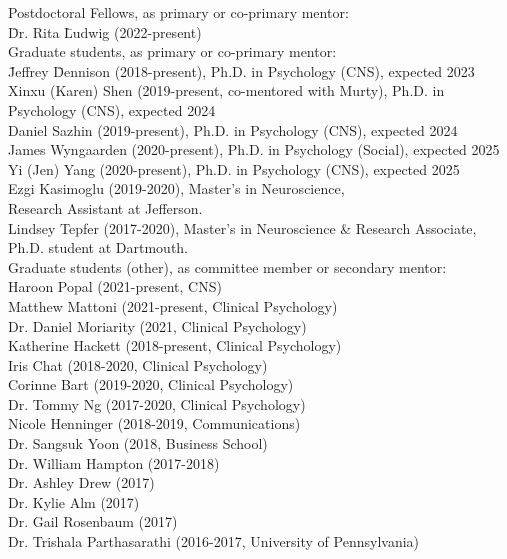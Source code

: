 \documentclass[11pt, letterpaper]{article}
\begin{document}
\begin{tabbing}
Postdoctoral Fellows, as primary or co-primary mentor: \\  [.1cm]
\hspace{.5in} \= Dr. Rita \= Ludwig (2022-present) \\ [.2cm]

Graduate students, as primary or co-primary mentor: \\  [.1cm]
\hspace{.5in} \= Jeffrey \= Dennison (2018-present), Ph.D. in Psychology (CNS), expected 2023 \\
\> Xinxu (Karen) Shen (2019-present, co-mentored with Murty), Ph.D. in Psychology (CNS), expected 2024 \\
\> Daniel Sazhin (2019-present), Ph.D. in Psychology (CNS), expected 2024 \\
\> James Wyngaarden (2020-present), Ph.D. in Psychology (Social), expected 2025 \\
\> Yi (Jen) Yang (2020-present), Ph.D. in Psychology (CNS), expected 2025 \\
\> Ezgi Kasimoglu (2019-2020), Master's in Neuroscience, \\ 
\> \> Research Assistant at Jefferson. \\
\> Lindsey Tepfer (2017-2020), Master's in Neuroscience \& Research Associate, \\
\> \> Ph.D. student at Dartmouth. \\ [.2cm]

Graduate students (other), as committee member or secondary mentor: \\  [.1cm]
\> Haroon Popal (2021-present, CNS) \\
\> Matthew Mattoni (2021-present, Clinical Psychology) \\
\> Dr. Daniel Moriarity (2021, Clinical Psychology) \\
\> Katherine Hackett (2018-present, Clinical Psychology) \\
\> Iris Chat (2018-2020, Clinical Psychology) \\
\> Corinne Bart (2019-2020, Clinical Psychology) \\
\> Dr. Tommy Ng (2017-2020, Clinical Psychology) \\
\> Nicole Henninger (2018-2019, Communications) \\
\> Dr. Sangsuk Yoon (2018, Business School) \\
\> Dr. William Hampton (2017-2018) \\
\> Dr. Ashley Drew (2017) \\
\> Dr. Kylie Alm (2017) \\
\> Dr. Gail Rosenbaum (2017) \\
\> Dr. Trishala Parthasarathi (2016-2017, University of Pennsylvania) \\ [.2cm]


\end{tabbing}
\end{document}
